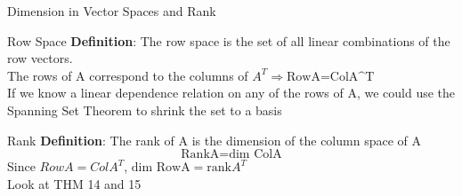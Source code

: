 \documentclass[a4paper, 12pt]{article}
\begin{document}
\begin{section}{Dimension in Vector Spaces and Rank}
\begin{subsection}{Row Space}
\textbf{Definition}: The row space is the set of all linear combinations of the
row vectors.\\
The rows of A correspond to the columns of $A^{T} \Rightarrow \mbox{RowA=ColA^{T}}$
\\ If we know a linear dependence relation on any of the rows of A, we could use
the Spanning Set Theorem to shrink the set to a basis
\end{subsection}
\begin{subsection}{Rank}
\textbf{Definition}: The rank of A is the dimension of the column space of A
\begin{equation}
\mbox{RankA}=\mbox{dim ColA}
\end{equation}
Since $RowA=ColA^{T}$, $\mbox{dim RowA}=\mbox{rank}A^{T}$ \\
Look at THM 14 and 15
\end{subsection}
\end{section}
\end{document}
